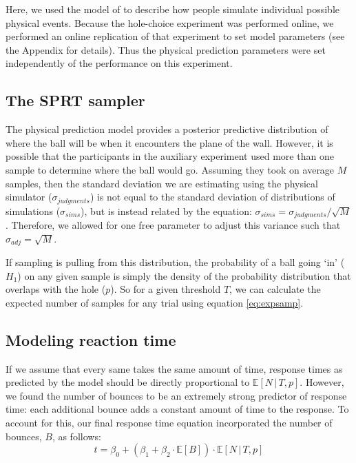 \documentclass[10pt,letterpaper]{article}
\begin{document}
Here, we used the model of  to describe how people simulate individual possible physical events. Because the hole-choice experiment was performed online, we performed an online replication of that experiment to set model parameters (see the Appendix for details). Thus the physical prediction parameters were set independently of the performance on this experiment.

\subsection{The SPRT sampler}

The physical prediction model provides a posterior predictive distribution of where the ball will be when it encounters the plane of the wall. However, it is possible that the participants in the auxiliary experiment used more than one sample to determine where the ball would go. Assuming they took on average $M$ samples, then the standard deviation we are estimating using the physical simulator ($\sigma_{judgments}$) is not equal to the standard deviation of distributions of simulations ($\sigma_{sims}$), but is instead related by the equation: $\sigma_{sims} = \sigma_{judgments} / \sqrt{M}$. Therefore, we allowed for one free parameter to adjust this variance such that $\sigma_{adj}=\sqrt{M}$.

If sampling is pulling from this distribution, the probability of a ball going `in' ($H_1$) on any given sample is simply the density of the probability distribution that overlaps with the hole ($p$). So for a given threshold $T$, we can calculate the expected number of samples for any trial using equation \ref{eq:expsamp}.

\subsection{Modeling reaction time}

If we assume that every same takes the same amount of time, response times as predicted by the model should be directly proportional to $\mathbb{E}[N\,|\,T,p]$. However, we found the number of bounces to be an extremely strong predictor of response time: each additional bounce adds a constant amount of time to the response. To account for this, our final response time equation incorporated the number of bounces, $B$, as follows:
\begin{equation}
t = \beta_0 + (\beta_1 + \beta_2\cdot{}\mathbb{E}[B]) \cdot{}\mathbb{E}[N\,|\,T,p]
\label{eq:rt}
\end{equation}
\end{document}
